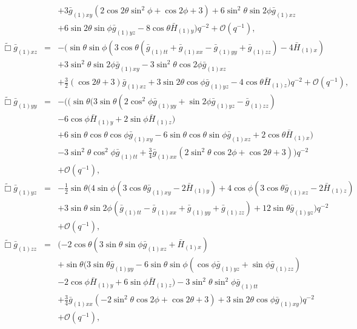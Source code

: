 \documentclass[a4paper,11pt]{article}
\numberwithin{equation}{section}
\begin{document}
\begin{eqnarray}
&&+3 \bar{g}_{(1)xy} (2 \cos 2\theta \sin ^2\phi +\cos 2 \phi +3)+6 \sin ^2\theta \sin 2 \phi 
  \bar{g}_{(1)xz} \nonumber \\
  &&+6 \sin 2 \theta \sin \phi \bar{g}_{(1)yz}-8 \cos
  \theta  \bar{H}_{(1) y})    q^{-2} +\mathcal{O}(q^{-1}),\\
%
\label{eqn:efexz}
\tilde{\Box}\bar{g}_{(1)xz}&=&- (\sin \theta  \sin \phi  (3 \cos \theta  (\bar{g}_{(1)tt}+\bar{g}_{(1)xx}-\bar{g}_{(1)yy}+\bar{g}_{(1)zz})-4
   \bar{H}_{(1) x}) \nonumber \\
   &&+3 \sin ^2\theta \sin 2 \phi  \bar{g}_{(1)xy}-3 \sin
   ^2\theta  \cos 2 \phi  \bar{g}_{(1)xz} \nonumber \\
   &&+\frac{3}{2} (\cos 2 \theta +3)
   \bar{g}_{(1)xz}+3 \sin 2 \theta  \cos \phi  \bar{g}_{(1)yz}-4 \cos
   \theta  \bar{H}_{(1)z})    q^{-2} +\mathcal{O}(q^{-1}),\\
%
\label{eqn:efeyy}
\tilde{\Box}\bar{g}_{(1)yy}&=&-( (\sin \theta (3 \sin \theta  (2 \cos ^2\phi  \bar{g}_{(1)yy}+\sin 2 \phi  \bar{g}_{(1)yz}-\bar{g}_{(1)zz}) \nonumber \\
&&-6 \cos\phi \bar{H}_{(1) y}+2 \sin \phi  \bar{H}_{(1) z}) \nonumber \\
&&+6 \sin \theta \cos
   \theta \cos \phi  \bar{g}_{(1)xy}-6 \sin \theta  \cos \theta  \sin   \phi  \bar{g}_{(1)xz}+2 \cos \theta  \bar{H}_{(1) x}) \nonumber \\
   &&-3 \sin ^2\theta \cos ^2\phi  \bar{g}_{(1)tt}+\frac{3}{4} \bar{g}_{(1)xx} (2 \sin ^2\theta  \cos 2 \phi +\cos 2 \theta +3)  )  q^{-2} \nonumber \\
&&+\mathcal{O}(q^{-1}),\\
%
\label{eqn:efeyz}
\tilde{\Box}\bar{g}_{(1)yz}&=&-\frac{1}{2} \sin \theta (4 \sin \phi  (3 \cos \theta  \bar{g}_{(1)xy}-2 \bar{H}_{(1) y})+4 \cos \phi  (3 \cos \theta  \bar{g}_{(1)xz}-2 \bar{H}_{(1) z}) \nonumber \\
&&+3 \sin \theta  \sin 2 \phi  (\bar{g}_{(1)tt}-\bar{g}_{(1)xx}+\bar{g}_{(1)yy}+\bar{g}_{(1)zz})+12 \sin \theta  \bar{g}_{(1)yz})  q^{-2} \nonumber \\
&&+\mathcal{O}(q^{-1}),\\
%
\label{eqn:efezz}
\tilde{\Box}\bar{g}_{(1)zz}&=&(-2 \cos \theta  (3 \sin \theta  \sin \phi  \bar{g}_{(1)xz}+\bar{H}_{(1)x}) \nonumber \\
&&+ \sin \theta  (3 \sin \theta  \bar{g}_{(1)yy}-6 \sin\theta  \sin \phi  (\cos \phi  \bar{g}_{(1)yz}+\sin \phi 
   \bar{g}_{(1)zz}) \nonumber \\
   &&-2 \cos \phi  \bar{H}_{(1) y} +6 \sin \phi  \bar{H}_{(1)z}) -3  \sin ^2\theta  \sin ^2\phi  \bar{g}_{(1)tt} \nonumber \\
   &&+\frac{3}{4}  \bar{g}_{(1)xx} (-2 \sin ^2\theta  \cos 2 \phi +\cos 2 \theta
   +3) +3 \sin 2 \theta  \cos \phi  \bar{g}_{(1)xy})  q^{-2} \nonumber \\
&&+\mathcal{O}(q^{-1}), 
\end{eqnarray}
\end{document}
